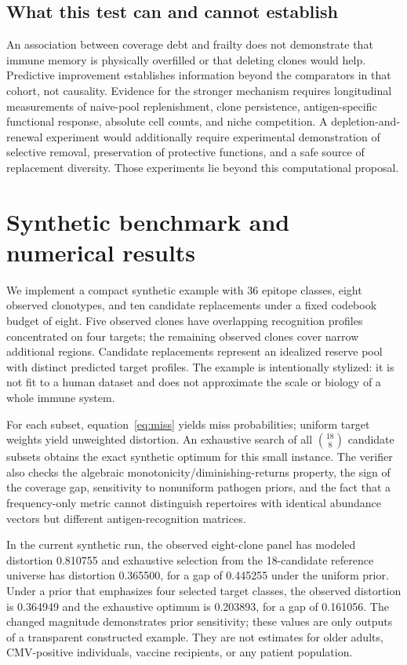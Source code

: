 \documentclass[11pt]{article}
\begin{document}
\subsection{What this test can and cannot establish}
An association between coverage debt and frailty does not demonstrate that immune memory is physically overfilled or that deleting clones would help. Predictive improvement establishes information beyond the comparators in that cohort, not causality. Evidence for the stronger mechanism requires longitudinal measurements of naive-pool replenishment, clone persistence, antigen-specific functional response, absolute cell counts, and niche competition. A depletion-and-renewal experiment would additionally require experimental demonstration of selective removal, preservation of protective functions, and a safe source of replacement diversity. Those experiments lie beyond this computational proposal.

\section{Synthetic benchmark and numerical results}
We implement a compact synthetic example with 36 epitope classes, eight observed clonotypes, and ten candidate replacements under a fixed codebook budget of eight. Five observed clones have overlapping recognition profiles concentrated on four targets; the remaining observed clones cover narrow additional regions. Candidate replacements represent an idealized reserve pool with distinct predicted target profiles. The example is intentionally stylized: it is not fit to a human dataset and does not approximate the scale or biology of a whole immune system.

For each subset, equation~\eqref{eq:miss} yields miss probabilities; uniform target weights yield unweighted distortion. An exhaustive search of all $\binom{18}{8}$ candidate subsets obtains the exact synthetic optimum for this small instance. The verifier also checks the algebraic monotonicity/diminishing-returns property, the sign of the coverage gap, sensitivity to nonuniform pathogen priors, and the fact that a frequency-only metric cannot distinguish repertoires with identical abundance vectors but different antigen-recognition matrices.

In the current synthetic run, the observed eight-clone panel has modeled distortion 0.810755 and exhaustive selection from the 18-candidate reference universe has distortion 0.365500, for a gap of 0.445255 under the uniform prior. Under a prior that emphasizes four selected target classes, the observed distortion is 0.364949 and the exhaustive optimum is 0.203893, for a gap of 0.161056. The changed magnitude demonstrates prior sensitivity; these values are only outputs of a transparent constructed example. They are not estimates for older adults, CMV-positive individuals, vaccine recipients, or any patient population.
\end{document}
